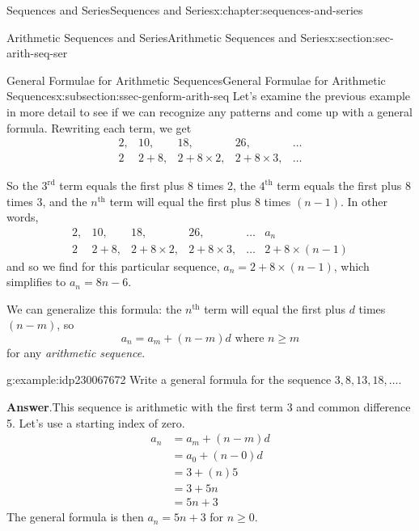 \documentclass[twoside,10pt,]{book}
\newcommand{\blocktitlefont}{\relax}
\numberwithin{equation}{section}
\newcommand{\nth}{{n^{\text{th}}}}
\newcommand{\upth}[1]{{#1^{\text{th}}}}
\newcommand{\uprd}[1]{{#1^{\text{rd}}}}
\newcommand{\amp}{&}
\begin{document}
\begin{chapterptx}{Sequences and Series}{}{Sequences and Series}{}{}{x:chapter:sequences-and-series}
\begin{sectionptx}{Arithmetic Sequences and Series}{}{Arithmetic Sequences and Series}{}{}{x:section:sec-arith-seq-ser}
\begin{subsectionptx}{General Formulae for Arithmetic Sequences}{}{General Formulae for Arithmetic Sequences}{}{}{x:subsection:ssec-genform-arith-seq}
Let's examine the previous example in more detail to see if we can recognize any patterns and come up with a general formula.  Rewriting each term, we get%
\begin{equation*}
\begin{array}{*{20}{c}}
{2,}\amp{10,}\amp{18,}\amp{26,}\amp{\ldots}\\
2\amp{2 + 8,}\amp{2 + 8\times 2,}\amp{2 + 8\times 3,}\amp{\ldots}
\end{array}
\end{equation*}
%
\par
So the \(\uprd{3}\) term equals the first plus 8 times 2, the \(\upth{4}\) term equals the first plus 8 times 3, and the \(\nth{}\) term will equal the first plus 8 times \((n - 1)\).   In other words,%
\begin{equation*}
\begin{array}{*{20}{c}}
{2,}\amp{10,}\amp{18,}\amp{26,}\amp{\ldots}\amp{a_n}\\
2\amp{2 + 8,}\amp{2 + 8 \times 2,}\amp{2 + 8 \times 3,}\amp{\ldots}\amp{2+8 \times (n-1)}
\end{array}
\end{equation*}
and so we find for this particular sequence, \(a_n=2+8 \times (n-1)\), which simplifies to \(a_n=8n-6\).%
\par
We can generalize this formula: the \(\nth{}\) term will equal the first plus \(d\) times \((n - m)\), so%
\begin{equation*}
a_n = a_m + \left( n - m \right)d \text{   where } n \ge m
\end{equation*}
for any \emph{arithmetic sequence}. \begin{example}{}{g:example:idp230067672}%
Write a general formula for the sequence \(3, 8, 13, 18, \ldots\).\par\smallskip%
\noindent\textbf{\blocktitlefont Answer}.\label{g:answer:idp230070104}{}\hypertarget{g:answer:idp230070104}{}\quad{}This sequence is arithmetic with the first term 3 and common difference 5.  Let's use a starting index of zero.%
\begin{align*}
a_n \amp = a_m + \left( n - m \right)d\\
\amp = {a_0} + \left( {n - 0} \right)d\\
\amp = 3 + \left( {n} \right)5\\
\amp = 3 + 5n\\
\amp = 5n + 3
\end{align*}
The general formula is then \(a_n = 5n + 3\) for \(n \ge 0\).\end{example}

\end{subsectionptx}
\end{sectionptx}
\end{chapterptx}
\end{document}
